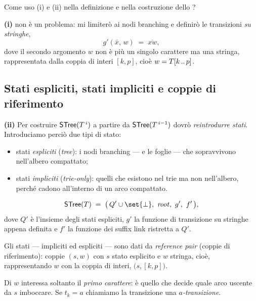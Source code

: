 \begin{domanda}
Come uso (i) e (ii) nella definizione e nella costruzione dello \STree{}?
\end{domanda}

\textbf{(i)} non è un problema: mi limiterò ai nodi branching e definirò le transizioni
\emph{su stringhe},
\[
  g'(\bar x,\,w) \;=\; \overline{xw},
\]
dove il secondo argomento $w$ non è più un singolo carattere ma una stringa, rappresentata
dalla coppia di interi $[k,p]$, cioè $w = T[k\,..\,p]$.

\subsection[Stati espliciti e impliciti]{Stati espliciti, stati impliciti e coppie di riferimento}

\textbf{(ii)} Per costruire $\textsf{STree}{}(T^{\,i})$ a partire da $\textsf{STree}{}(T^{\,i-1})$ dovrò
\emph{reintrodurre stati}. Introduciamo perciò due tipi di stato:
\begin{itemize}
  \item stati \emph{espliciti} (\emph{tree}): i nodi branching --- e le foglie --- che
        sopravvivono nell'albero compattato;
  \item stati \emph{impliciti} (\emph{trie-only}): quelli che esistono nel trie ma non
        nell'albero, perché cadono all'interno di un arco compattato.
\end{itemize}

\begin{definizione}\label{def:stree-automa}
\[
  \STree{}(T) \;=\; \bigl(\, Q' \cup \set{\bot},\ \mathit{root},\ g',\ f' \,\bigr),
\]
dove $Q'$ è l'insieme degli stati espliciti, $g'$ la funzione di transizione su stringhe
appena definita e $f'$ la funzione dei suffix link ristretta a $Q'$.

Gli stati --- impliciti ed espliciti --- sono dati da \emph{reference pair} (coppie di
riferimento): coppie $(s,w)$ con $s$ stato esplicito e $w$ stringa, cioè, rappresentando $w$
con la coppia di interi, $\bigl(s,[k,p]\bigr)$.
\end{definizione}

\begin{osservazione}
Di $w$ interessa soltanto il \emph{primo carattere}: è quello che decide quale arco uscente da
$s$ imboccare. Se $t_k = a$ chiamiamo la transizione una \emph{$a$-transizione}.
\end{osservazione}


